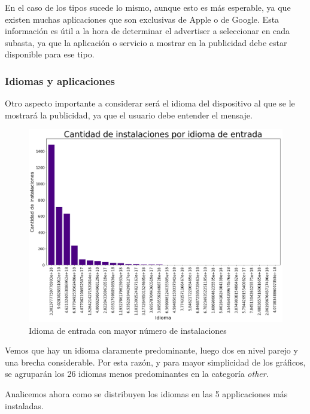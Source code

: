 \documentclass[a4paper, 12pt]{article}
\begin{document}
		En el caso de los tipos sucede lo mismo, aunque esto es más esperable, ya que existen muchas aplicaciones que son exclusivas de Apple o de Google. Esta información es útil a la hora de determinar el advertiser a seleccionar en cada subasta, ya que la aplicación o servicio a mostrar en la publicidad debe estar disponible para ese tipo.
	
	\subsubsection{Idiomas y aplicaciones}
		Otro aspecto importante a considerar será el idioma del dispositivo al que se le mostrará la publicidad, ya que el usuario debe entender el mensaje. 
		
		\FloatBarrier
		\begin{figure}[h]
			\centering
			\includegraphics[width=\textwidth]{images/installs/idiomas.png}
			\caption{Idioma de entrada con mayor número de instalaciones}
		\end{figure}
		\FloatBarrier
		
		Vemos que hay un idioma claramente predominante, luego dos en nivel parejo y una brecha considerable.
		Por esta razón, y para mayor simplicidad de los gráficos, se agruparán los 26 idiomas menos predominantes en la categoría \textit{other}. 
		
		Analicemos ahora como se distribuyen los idiomas en las 5 applicaciones más instaladas.
		
\end{document}
